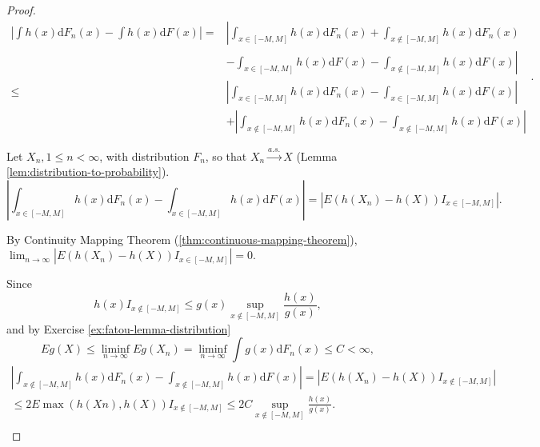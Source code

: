 \begin{proof}
    \begin{equation*}
        \begin{aligned}
            \left|\int h(x)\mathrm{d}F_{n}(x)-\int h(x)\mathrm{d}F(x)\right| = & \left|{\int_{x\in[-M,M]}h(x)\mathrm{d}F_{n}(x)+\int_{x\notin[-M,M]}h(x)\mathrm{d}F_{n}(x)}\right. \\
                                                                               & \left.{-\int_{x\in[-M,M]}h(x)\mathrm{d}F(x)-\int_{x\notin[-M,M]}h(x)\mathrm{d}F(x)}\right|        \\
            \leq                                                               & \left|\int_{x\in[-M,M]}h(x)\mathrm{d}F_{n}(x)-\int_{x\in[-M,M]}h(x)\mathrm{d}F(x)\right|          \\
                                                                               & + \left|\int_{x\notin[-M,M]}h(x)\mathrm{d}F_{n}(x)-\int_{x\notin[-M,M]}h(x)\mathrm{d}F(x)\right|
        \end{aligned}.
    \end{equation*}

    Let $X_n,1\leq n<\infty$, with distribution $F_n$, so that $X_n\stackrel{a.s.}{\rightarrow}X$ (Lemma \ref{lem:distribution-to-probability}).
    \begin{equation*}
        \left|\int_{x\in[-M,M]}h(x)\mathrm{d}F_{n}(x)-\int_{x\in[-M,M]}h(x)\mathrm{d}F(x)\right| = \left|E\left(h(X_n)-h(X)\right)I_{x\in[-M,M]}\right|.
    \end{equation*}

    By Continuity Mapping Theorem (\ref{thm:continuous-mapping-theorem}), $\lim_{n\rightarrow\infty}\left|E\left(h(X_n)-h(X)\right)I_{x\in[-M,M]}\right| = 0$.

    Since
    \begin{equation*}
        h(x)I_{x\notin[-M,M]}\leq g(x)\sup_{x\notin[-M,M]}\frac{h(x)}{g(x)},
    \end{equation*}
    and by Exercise \ref{ex:fatou-lemma-distribution}
    \begin{equation*}
        Eg(X) \leq \liminf_{n\rightarrow\infty}Eg(X_n)=\liminf_{n\rightarrow\infty}\int g(x)\mathrm{d}F_{n}(x)\leq C<\infty,
    \end{equation*}
    \begin{equation*}
        \begin{aligned}
            \left|\int_{x\notin[-M,M]}h(x)\mathrm{d}F_{n}(x)-\int_{x\notin[-M,M]}h(x)\mathrm{d}F(x)\right| = \left|E\left(h(X_n)-h(X)\right)I_{x\notin[-M,M]}\right| \\
            \leq 2E\max(h(Xn),h(X))I_{x\notin[-M,M]}\leq 2C\sup_{x\notin[-M,M]}\frac{h(x)}{g(x)}.                                                                    \\
        \end{aligned}
    \end{equation*}


\end{proof}
